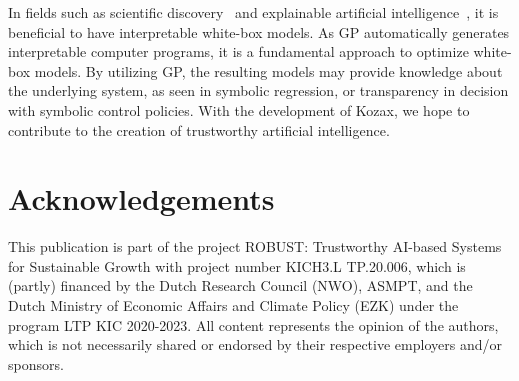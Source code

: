 \documentclass{article}
\begin{document}
In fields such as scientific discovery~\cite{wang2023scientific} and explainable artificial intelligence~\cite{puiutta2020explainable}, it is beneficial to have interpretable white-box models. As GP automatically generates interpretable computer programs, it is a fundamental approach to optimize white-box models. By utilizing GP, the resulting models may provide knowledge about the underlying system, as seen in symbolic regression, or transparency in decision with symbolic control policies. With the development of Kozax, we hope to contribute to the creation of trustworthy artificial intelligence. 

\section{Acknowledgements}
This publication is part of the project ROBUST: Trustworthy AI-based Systems for Sustainable Growth with project number KICH3.L TP.20.006, which is (partly) financed by the Dutch Research Council (NWO), ASMPT, and the Dutch Ministry of Economic Affairs and Climate Policy (EZK) under the program LTP KIC 2020-2023. All content represents the opinion of the authors, which is not necessarily shared or endorsed by their respective employers and/or sponsors.

\printbibliography






\end{document}
